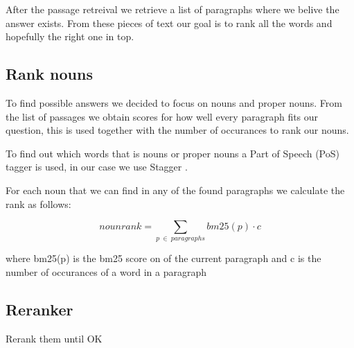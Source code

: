 After the passage retreival we retrieve a list of paragraphs where we belive the answer exists. 
From these pieces of text our goal is to rank all the words and hopefully the right one in top.

\subsection{Rank nouns}

To find possible answers we decided to focus on nouns and proper nouns. 
From the list of passages we obtain scores for how well every paragraph fits our question, 
this is used together with the number of occurances to rank our nouns.

To find out which words that is nouns or proper nouns a Part of Speech (PoS) tagger is used, in our case we use Stagger \cite{stagger}.

For each noun that we can find in any of the found paragraphs we calculate the rank as follows:

\[ nounrank = \sum_{p\:\in\:paragraphs}bm25(p) \cdot c \]

where bm25(p) is the bm25 score on of the current paragraph and c is the number of occurances of a word in a paragraph

\subsection{Reranker}

Rerank them until OK

